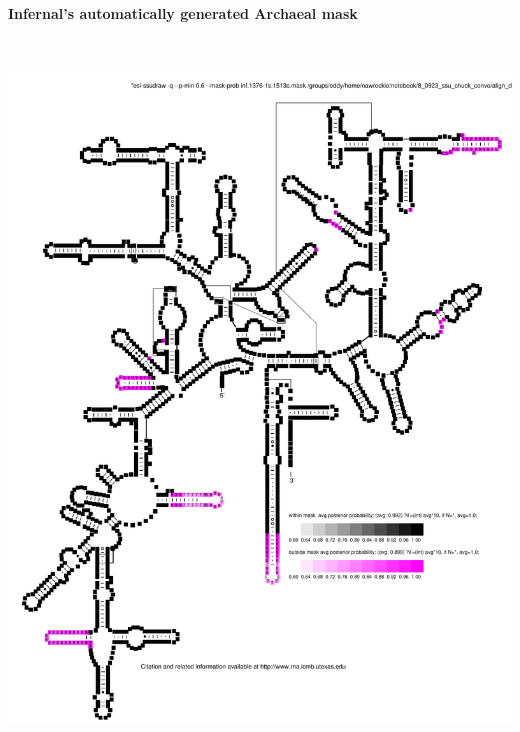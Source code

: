 \documentclass[landscape]{slides}
\begin{document}
\begin{slide}
\begin{center}
\large
\textbf{Infernal's automatically generated Archaeal mask}
\end{center}
\small

\begin{center}
\includegraphics[height=7.5in]{figs/inf-lm}

\end{center}
\vfill
\end{slide}
\end{document}
